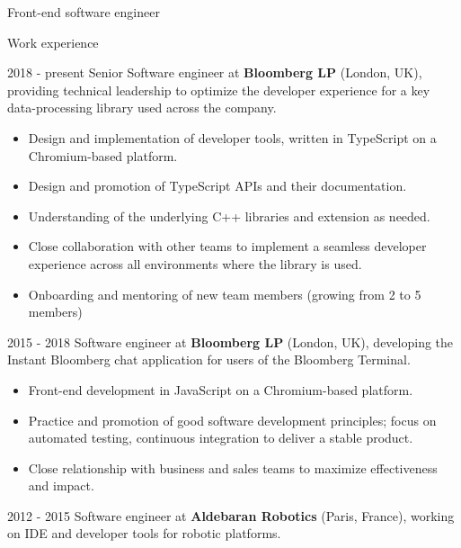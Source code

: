 \documentclass{article}
\begin{document}
\begin{cv}{Front-end software engineer}

\vskip 3mm

\begin{cvlist}{Work experience}
    \item[2018 - present] Senior Software engineer at \textbf{Bloomberg LP}
      (London, UK), providing technical leadership to optimize the developer
      experience for a key data-processing library used across the company.

      \begin{itemize}
      \item Design and implementation of developer tools, written in TypeScript on a Chromium-based platform.
      \item Design and promotion of TypeScript APIs and their documentation.
      \item Understanding of the underlying C++ libraries and extension as needed.
      \item Close collaboration with other teams to implement a seamless developer experience across all environments where the library is used.
      \item Onboarding and mentoring of new team members (growing from 2 to 5 members)
      \end{itemize}

    \item[2015 - 2018] Software engineer at \textbf{Bloomberg LP} (London, UK),
      developing the Instant Bloomberg chat application for users of the Bloomberg
      Terminal.

      \begin{itemize}
      \item Front-end development in JavaScript on a Chromium-based platform.

      \item Practice and promotion of good software development principles; focus on
      automated testing, continuous integration to deliver a stable product.

      \item Close relationship with business and sales teams to maximize effectiveness and impact.
      \end{itemize}

    \item[2012 - 2015] Software engineer at \textbf{Aldebaran Robotics}
      (Paris, France), working on IDE and developer tools for robotic platforms.


\end{cvlist}
\end{cv}
\end{document}
